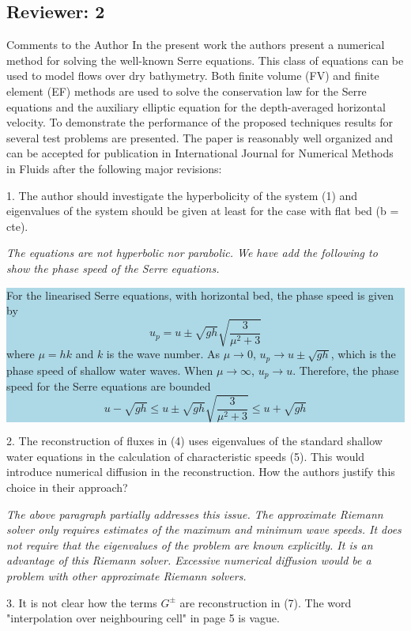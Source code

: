 \documentclass[subeqn]{article}
\newcommand{\hlb}[1] {\par\colorbox{lightblue}{\parbox{\linewidth}{#1}}}
\begin{document}
\subsection*{Reviewer: 2}

Comments to the Author
In the present work the authors present a numerical method for solving the well-known Serre equations. This class of equations can be used to model flows over dry bathymetry. Both finite volume (FV) and finite element (EF) methods are used to solve the conservation law for the Serre equations and the auxiliary elliptic equation for the depth-averaged horizontal velocity. To demonstrate the performance of the proposed techniques results for several test problems are presented. The paper is reasonably well organized and can be accepted for publication in International Journal for Numerical Methods in Fluids after the following major revisions:

1. The author should investigate the hyperbolicity of the system (1) and eigenvalues of the system should be given at least for the case with flat bed (b = cte).

\emph{The equations are not hyperbolic nor parabolic. We have add the following to show the phase speed of the Serre equations.}

\hlb{For the linearised Serre equations, with horizontal bed, the phase speed is given by\cite{Zoppou-etal-2014}
\[
u_p = u \pm \sqrt{gh} \sqrt{\dfrac{3}{\mu^2 + 3}}
\]
where $\mu = h k$ and $k$ is the wave number. As $\mu \rightarrow 0$, $u_p \rightarrow u \pm \sqrt{gh}$, which is the phase speed of shallow water waves. When $\mu \rightarrow \infty$, $u_p \rightarrow u$. Therefore, the phase speed for the Serre equations are bounded
\[
u - \sqrt{gh} \le u \pm \sqrt{gh} \sqrt{\dfrac{3}{\mu^2 + 3}} \le u + \sqrt{gh}
\]
}
2. The reconstruction of fluxes in (4) uses eigenvalues of the standard shallow water equations in the calculation of characteristic speeds (5). This would introduce numerical diffusion in the reconstruction. How the authors justify this choice in their approach?

\emph{The above paragraph partially addresses this issue. The approximate Riemann solver only requires estimates of the maximum and minimum wave speeds. It does not require that the eigenvalues of the problem are known explicitly. It is an advantage of this Riemann solver. Excessive numerical diffusion would be a problem with other approximate Riemann solvers.}

3. It is not clear how the terms $G^\pm$ are reconstruction in (7). The word "interpolation over neighbouring cell" in page 5 is vague.
\end{document}
